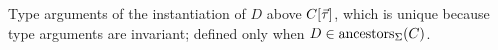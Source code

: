 Type arguments of the instantiation of $D$ above $C[\seq{\tau}]$, which is unique because type arguments are
invariant; defined only when $D \in \mathrm{ancestors}_{\Sigma}(C)$.
